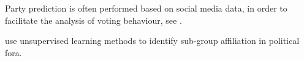 \documentclass[11pt]{article}
\begin{document}
Party prediction is often performed based on social media data, in order to facilitate the analysis of voting behaviour, see \textcite[][]{gottipati2013}.

\textcite[][]{abu2012} use unsupervised learning methods to identify sub-group affiliation in political fora.

\end{document}
